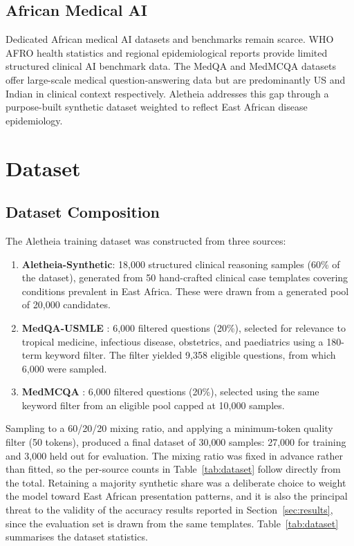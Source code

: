 \documentclass[conference]{IEEEtran}
\begin{document}
\subsection{African Medical AI}

Dedicated African medical AI datasets and benchmarks remain scarce.
WHO AFRO health statistics \cite{afrihealth2023} and regional
epidemiological reports provide limited structured clinical AI benchmark data. The MedQA \cite{jin2021medqa} and
MedMCQA \cite{pmlr-v174-pal22a} datasets offer large-scale medical
question-answering data but are predominantly US and Indian in
clinical context respectively. Aletheia addresses this gap through
a purpose-built synthetic dataset weighted to reflect East African
disease epidemiology.

\section{Dataset}
\label{sec:dataset}

\subsection{Dataset Composition}

The Aletheia training dataset was constructed from three sources:

\begin{enumerate}
  \item \textbf{Aletheia-Synthetic}: 18{,}000 structured clinical
        reasoning samples (60\% of the dataset), generated from 50
        hand-crafted clinical case templates covering conditions
        prevalent in East Africa. These were drawn from a generated
        pool of 20{,}000 candidates.
  \item \textbf{MedQA-USMLE} \cite{jin2021medqa}: 6{,}000 filtered
        questions (20\%), selected for relevance to tropical medicine,
        infectious disease, obstetrics, and paediatrics using a
        180-term keyword filter. The filter yielded 9{,}358 eligible
        questions, from which 6{,}000 were sampled.
  \item \textbf{MedMCQA} \cite{pmlr-v174-pal22a}: 6{,}000 filtered
        questions (20\%), selected using the same keyword filter from
        an eligible pool capped at 10{,}000 samples.
\end{enumerate}

Sampling to a 60/20/20 mixing ratio, and applying a minimum-token
quality filter (50 tokens), produced a final dataset of 30{,}000
samples: 27{,}000 for training and 3{,}000 held out for evaluation.
The mixing ratio was fixed in advance rather than fitted, so the
per-source counts in Table~\ref{tab:dataset} follow directly from the
total. Retaining a majority synthetic share was a deliberate choice to
weight the model toward East African presentation patterns, and it is
also the principal threat to the validity of the accuracy results
reported in Section~\ref{sec:results}, since the evaluation set is
drawn from the same templates.
Table~\ref{tab:dataset} summarises the dataset statistics.
\end{document}
